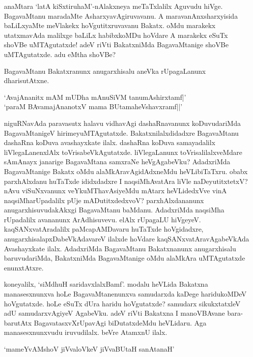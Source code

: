 anaMtara `latA kiSxtiruhaM'-nAlakxneya meTaTxlalilx Aguvudu hiVge. BagavaMtanu maradaMte AsharxyavAgiruvavanu. A maravanAnxsharxyisida baLiLxyaMte meVlakekx hoVgutitxruvavanu Bakatx. oMdu marakekx utatxmavAda malilxge baLiLx habibxkoMDu hoVdare A marakekx eSuTx shoVBe uMTAgutatxde! adeV riVti BakatxniMda BagavaMtanige shoVBe uMTAgutatxde. adu eMtha shoVBe?

BagavaMtanu Bakatxranunx anugarxhisalu aneVka rUpagaLanunx dharisutAtxne. 

\begin{shloka}
`AvajAnanitx mAM mUDha mAnuSiVM tanumAshirxtamf|'\\
`paraM BAvamajAnanotxV mama BUtamaheVshavxramf||'
\end{shloka}

niguRNavAda paravasutx halavu vidhavAgi dashaRnavanunx koDuvudariMda BagavaMtanigeV hirimeyuMTAgutatxde. Bakatxnilalxdidadxre BagavaMtanu dashaRna koDuva avashayxkate ilalx. dashaRna koDuva samayadalilx liVlegaLanenxlAlx toVrisabeVkAgutatxde. liVlegaLanunx toVrisalilalxveMdare sAmAnayx janarige BagavaMtana samxraNe heVgAgabeVku? AdadxriMda BagavaMtanige Bakatx oMdu alaMkAravAgidAdxneMdu heVLibiTaTxru. obabx parxhAlxdanu huTaTxde ididxdadxre I naqsiMhAvatAra liVle naDeyutitxtetxV? nAvu viSuNxvanunx veYkuMThavAsiyeMdu mAtarx heVLidedxVve vinA naqsiMharUpadalilx pUje mADutitxdedxvoV? parxhAlxdananunx anugarxhisuvudakAkxgi BagavaMtanu baMdanu. AdadxriMda naqsiMha rUpadalilx avananunx ArAdhisuvevu. elAlx rUpagaLU hiVgeyeV. kaqSANxvatAradalilx paMcapAMDavaru huTaTxde hoVgidadxre, anugarxhisalapxDabeVkAdavareV ilalxde hoVdare kaqSANxvatAravAgabeVkAda Avashayxkate ilalx. AdadxriMda BagavaMtanu Bakatxnanunx anugarxhisalu baruvudariMda, BakatxniMda BagavaMtanige oMdu alaMkAra uMTAgutatxde enunxtAtxre.

koneyalilx, `siMdhuH saridavxlalxBamf'. modalu heVLida Bakatxna manasesxnunxva hoLe BagavaMtanenunxva samudarxda kaDege haridukoMDeV hoVgutatxde. hoLe eSuTx dUra haridu hoVgutatxde? samudarx sikukxtatxleV adU samudarxvAgiyeV AgabeVku. adeV riVti Bakatxna I manoVBAvane bara-barutAtx BagavatasxvXrUpavAgi biDutatxdeMdu heVLidaru. Aga manasesxnunxvudu iruvudilalx. beVre AtamxnU ilalx.

\begin{shloka}
`mameYvAMshoV jiVvaloVkeV jiVvaBUtaH sanAtanaH'
\end{shloka}

